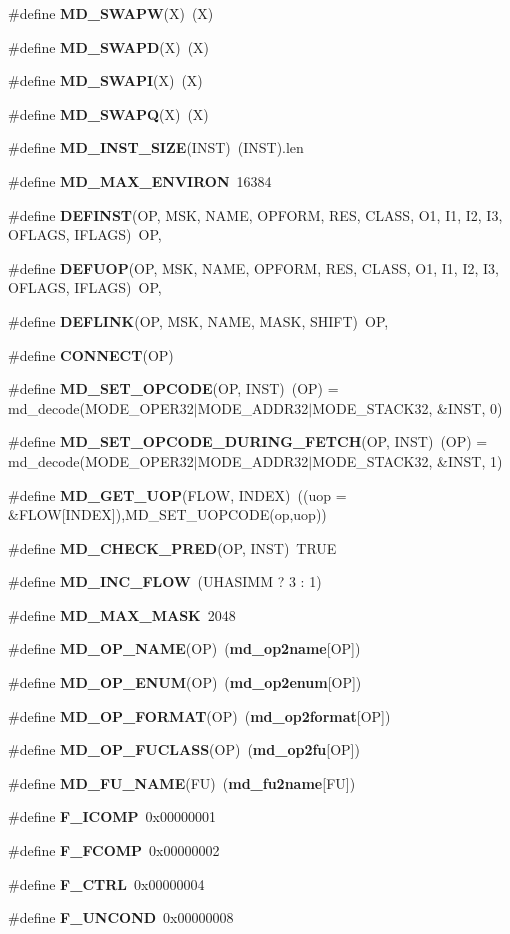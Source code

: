 \begin{CompactItemize}
\#define {\bf MD\_\-SWAPW}(X)~(X)
\item 
\#define {\bf MD\_\-SWAPD}(X)~(X)
\item 
\#define {\bf MD\_\-SWAPI}(X)~(X)
\item 
\#define {\bf MD\_\-SWAPQ}(X)~(X)
\item 
\#define {\bf MD\_\-INST\_\-SIZE}(INST)~(INST).len
\item 
\#define {\bf MD\_\-MAX\_\-ENVIRON}~16384
\item 
\#define {\bf DEFINST}(OP, MSK, NAME, OPFORM, RES, CLASS, O1, I1, I2, I3, OFLAGS, IFLAGS)~OP,
\item 
\#define {\bf DEFUOP}(OP, MSK, NAME, OPFORM, RES, CLASS, O1, I1, I2, I3, OFLAGS, IFLAGS)~OP,
\item 
\#define {\bf DEFLINK}(OP, MSK, NAME, MASK, SHIFT)~OP,
\item 
\#define {\bf CONNECT}(OP)
\item 
\#define {\bf MD\_\-SET\_\-OPCODE}(OP, INST)~(OP) = md\_\-decode(MODE\_\-OPER32$|$MODE\_\-ADDR32$|$MODE\_\-STACK32, \&INST, 0)
\item 
\#define {\bf MD\_\-SET\_\-OPCODE\_\-DURING\_\-FETCH}(OP, INST)~(OP) = md\_\-decode(MODE\_\-OPER32$|$MODE\_\-ADDR32$|$MODE\_\-STACK32, \&INST, 1)
\item 
\#define {\bf MD\_\-GET\_\-UOP}(FLOW, INDEX)~((uop = \&FLOW[INDEX]),MD\_\-SET\_\-UOPCODE(op,uop))
\item 
\#define {\bf MD\_\-CHECK\_\-PRED}(OP, INST)~TRUE
\item 
\#define {\bf MD\_\-INC\_\-FLOW}~(UHASIMM ? 3 : 1)
\item 
\#define {\bf MD\_\-MAX\_\-MASK}~2048
\item 
\#define {\bf MD\_\-OP\_\-NAME}(OP)~({\bf md\_\-op2name}[OP])
\item 
\#define {\bf MD\_\-OP\_\-ENUM}(OP)~({\bf md\_\-op2enum}[OP])
\item 
\#define {\bf MD\_\-OP\_\-FORMAT}(OP)~({\bf md\_\-op2format}[OP])
\item 
\#define {\bf MD\_\-OP\_\-FUCLASS}(OP)~({\bf md\_\-op2fu}[OP])
\item 
\#define {\bf MD\_\-FU\_\-NAME}(FU)~({\bf md\_\-fu2name}[FU])
\item 
\#define {\bf F\_\-ICOMP}~0x00000001
\item 
\#define {\bf F\_\-FCOMP}~0x00000002
\item 
\#define {\bf F\_\-CTRL}~0x00000004
\item 
\#define {\bf F\_\-UNCOND}~0x00000008
\item 

\end{CompactItemize}

